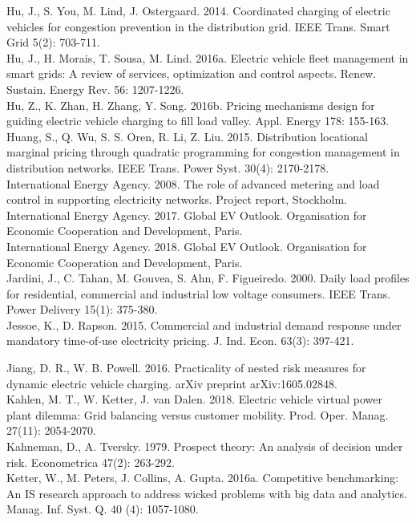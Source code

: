 \documentclass[10pt]{article}
\begin{document}
Hu, J., S. You, M. Lind, J. Ostergaard. 2014. Coordinated charging of electric vehicles for congestion prevention in the distribution grid. IEEE Trans. Smart Grid 5(2): 703-711.\\
Hu, J., H. Morais, T. Sousa, M. Lind. 2016a. Electric vehicle fleet management in smart grids: A review of services, optimization and control aspects. Renew. Sustain. Energy Rev. 56: 1207-1226.\\
Hu, Z., K. Zhan, H. Zhang, Y. Song. 2016b. Pricing mechanisms design for guiding electric vehicle charging to fill load valley. Appl. Energy 178: 155-163.\\
Huang, S., Q. Wu, S. S. Oren, R. Li, Z. Liu. 2015. Distribution locational marginal pricing through quadratic programming for congestion management in distribution networks. IEEE Trans. Power Syst. 30(4): 2170-2178.\\
International Energy Agency. 2008. The role of advanced metering and load control in supporting electricity networks. Project report, Stockholm.\\
International Energy Agency. 2017. Global EV Outlook. Organisation for Economic Cooperation and Development, Paris.\\
International Energy Agency. 2018. Global EV Outlook. Organisation for Economic Cooperation and Development, Paris.\\
Jardini, J., C. Tahan, M. Gouvea, S. Ahn, F. Figueiredo. 2000. Daily load profiles for residential, commercial and industrial low voltage consumers. IEEE Trans. Power Delivery 15(1): 375-380.\\
Jessoe, K., D. Rapson. 2015. Commercial and industrial demand response under mandatory time-of-use electricity pricing. J. Ind. Econ. 63(3): 397-421.

Jiang, D. R., W. B. Powell. 2016. Practicality of nested risk measures for dynamic electric vehicle charging. arXiv preprint arXiv:1605.02848.\\
Kahlen, M. T., W. Ketter, J. van Dalen. 2018. Electric vehicle virtual power plant dilemma: Grid balancing versus customer mobility. Prod. Oper. Manag. 27(11): 2054-2070.\\
Kahneman, D., A. Tversky. 1979. Prospect theory: An analysis of decision under risk. Econometrica 47(2): 263-292.\\
Ketter, W., M. Peters, J. Collins, A. Gupta. 2016a. Competitive benchmarking: An IS research approach to address wicked problems with big data and analytics. Manag. Inf. Syst. Q. 40 (4): 1057-1080.
\end{document}
